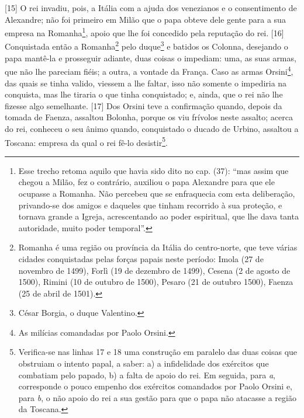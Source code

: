 {[}15{]} O rei invadiu, pois, a Itália com a ajuda dos venezianos e o
consentimento de Alexandre; não foi primeiro em Milão que o papa obteve
dele gente para a sua empresa na Romanha\footnote{Esse trecho retoma
  aquilo que havia sido dito no cap.  (37): ``mas assim que chegou a
  Milão, fez o contrário, auxiliou o papa Alexandre para que ele
  ocupasse a Romanha. Não percebeu que se enfraquecia com esta
  deliberação, privando-se dos amigos e daqueles que tinham recorrido à
  sua proteção, e tornava grande a Igreja, acrescentando ao poder
  espiritual, que lhe dava tanta autoridade, muito poder temporal''.},
apoio que lhe foi concedido pela reputação do rei. {[}16{]} Conquistada
então a Romanha\footnote{Romanha é uma região ou província da Itália do
  centro-norte, que teve várias cidades conquistadas pelas forças papais
  neste período: Imola (27 de novembro de 1499), Forlì (19 de dezembro
  de 1499), Cesena (2 de agosto de 1500), Rimini (10 de outubro de
  1500), Pesaro (21 de outubro 1500), Faenza (25 de abril de 1501).}
pelo duque\footnote{César Borgia, o duque Valentino.} e batidos os
Colonna, desejando o papa mantê-la e prosseguir adiante, duas coisas o
impediam: uma, as suas armas, que não lhe pareciam fiéis; a outra, a
vontade da França. Caso as armas Orsini\footnote{As milícias comandadas
  por Paolo Orsini.}, das quais se tinha valido, viessem a lhe faltar,
isso não somente o impediria na conquista, mas lhe tiraria o que tinha
conquistado; e, ainda, que o rei não lhe fizesse algo semelhante.
{[}17{]} Dos Orsini teve a confirmação quando, depois da tomada de
Faenza, assaltou Bolonha, porque os viu frívolos neste assalto; acerca
do rei, conheceu o seu ânimo quando, conquistado o ducado de Urbino,
assaltou a Toscana: empresa da qual o rei fê-lo desistir\footnote{Verifica-se
  nas linhas 17 e 18 uma construção em paralelo das duas coisas que
  obstruiam o intento papal, a saber: a) a infidelidade dos exércitos
  que combatiam pelo papado, b) a falta de apoio do rei. Em seguida,
  para \emph{a}, corresponde o pouco empenho dos exércitos comandados
  por Paolo Orsini e, para \emph{b}, o não apoio do rei a sua gestão
  para que o papa não atacasse a região da Toscana.}.

